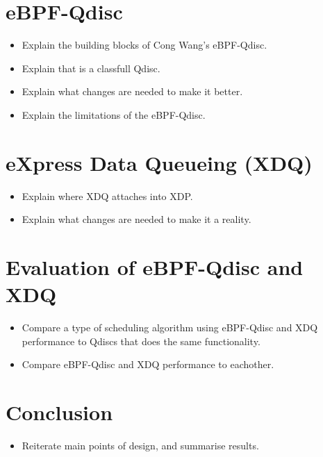 \documentclass[sigconf, nonacm]{acmart}
\begin{document}
\section{eBPF-Qdisc}

\begin{itemize}
  \item Explain the building blocks of Cong Wang's eBPF-Qdisc.
  \item Explain that is a classfull Qdisc.
  \item Explain what changes are needed to make it better.
  \item Explain the limitations of the eBPF-Qdisc.
\end{itemize}


\section{eXpress Data Queueing (XDQ)}

\begin{itemize}
  \item Explain where XDQ attaches into XDP.
  \item Explain what changes are needed to make it a reality.
\end{itemize}

\section{Evaluation of eBPF-Qdisc and XDQ}

\begin{itemize}
  \item Compare a type of scheduling algorithm using eBPF-Qdisc and XDQ performance to Qdiscs that does the same functionality.
  \item Compare eBPF-Qdisc and XDQ performance to eachother.
\end{itemize}

\section{Conclusion}

\begin{itemize}
  \item Reiterate main points of design, and summarise results.
\end{itemize}





\end{document}
